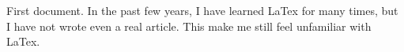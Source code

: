 \documentclass[•]{article}
\begin{document}
First document.
In the past few years, I have learned LaTex for many times, but I have not wrote even a real article. This make me still feel unfamiliar with LaTex.
\end{document}
